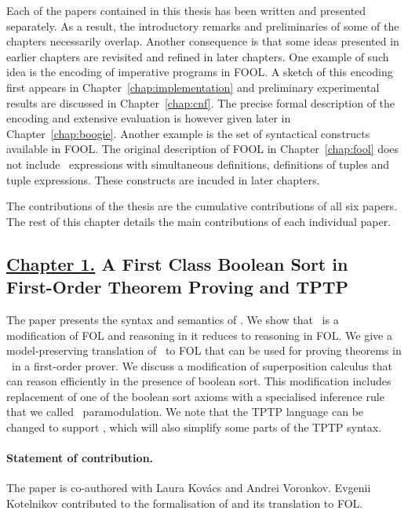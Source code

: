 Each of the papers contained in this thesis has been written and presented separately. As a result, the introductory remarks and preliminaries of some of the chapters necessarily overlap. Another consequence is that some ideas presented in earlier chapters are revisited and refined in later chapters. One example of such idea is the encoding of imperative programs in FOOL. A sketch of this encoding first appears in Chapter~\ref{chap:implementation} and preliminary experimental results are discussed in Chapter~\ref{chap:cnf}. The precise formal description of the encoding and extensive evaluation is however given later in Chapter~\ref{chap:boogie}. Another example is the set of syntactical constructs available in FOOL. The original description of FOOL in Chapter~\ref{chap:fool} does not include \LETIN\ expressions with simultaneous definitions, definitions of tuples and tuple expressions. These constructs are incuded in later chapters.

The contributions of the thesis are the cumulative contributions of all six papers. The rest of this chapter details the main contributions of each individual paper.

\subsection*{\hyperref[chap:fool]{Chapter 1.} A First Class Boolean Sort in\\First-Order Theorem Proving and TPTP}
The paper presents the syntax and semantics of \folb. We show that \folb\ is a modification of FOL and reasoning in it reduces to reasoning in FOL. We give a model-preserving \iffalse(modulo introduced definitions)\fi translation of \folb\ to FOL that can be used for proving theorems in \folb\ in a first-order prover. We discuss a modification of superposition calculus that can reason efficiently in the presence of boolean sort. This modification includes replacement of one of the boolean sort axioms with a specialised inference rule that we called \folb\ paramodulation. We note that the TPTP language can be changed to support \folb, which will also simplify some parts of the TPTP syntax. 

\paragraph{Statement of contribution.} The paper is co-authored with Laura Kov\'{a}cs and Andrei Voronkov. Evgenii Kotelnikov contributed to the formalisation of \folb{} and its translation to FOL.

